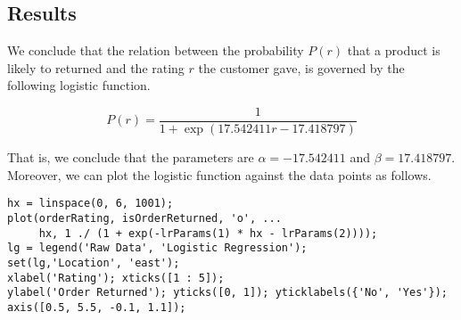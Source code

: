 \subsection{Results}

We conclude that the relation between the probability $P(r)$ that a product is likely to returned and the rating $r$ the customer gave, is governed by the following logistic function.

$$P(r) = \frac{1}{1 + \exp(17.542411 r - 17.418797)}$$

\noindent
That is, we conclude that the parameters are $\alpha = -17.542411$ and $\beta = 17.418797$. Moreover, we can plot the logistic function against the data points as follows.

\begin{lstlisting}
hx = linspace(0, 6, 1001);
plot(orderRating, isOrderReturned, 'o', ...
     hx, 1 ./ (1 + exp(-lrParams(1) * hx - lrParams(2))));
lg = legend('Raw Data', 'Logistic Regression');
set(lg,'Location', 'east');
xlabel('Rating'); xticks([1 : 5]);
ylabel('Order Returned'); yticks([0, 1]); yticklabels({'No', 'Yes'});
axis([0.5, 5.5, -0.1, 1.1]);
\end{lstlisting}


